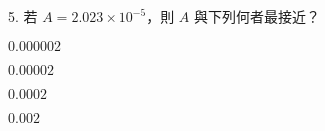 \documentclass[12pt]{article}
\begin{document}
\begin{problem}
  \item[5.] 若 $A = 2.023 \times 10^{-5}$，則 $A$ 與下列何者最接近？
  \begin{choices}
    \item $0.000002$
    \item $0.00002$
    \item $0.0002$
    \item $0.002$
  \end{choices}
\end{problem}
\end{document}
